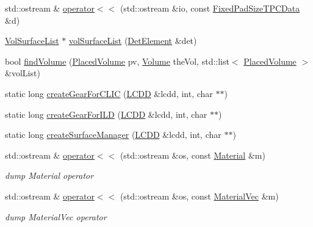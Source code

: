 \begin{DoxyCompactItemize}
\item 
std::ostream \& \hyperlink{namespace_d_d4hep_1_1_d_d_rec_aa514e41eeafbaef792fcf63b9f571f79}{operator$<$$<$} (std::ostream \&io, const \hyperlink{struct_d_d4hep_1_1_d_d_rec_1_1_struct_extension}{FixedPadSizeTPCData} \&d)
\item 
\hyperlink{struct_d_d4hep_1_1_d_d_rec_1_1_vol_surface_list}{VolSurfaceList} $\ast$ \hyperlink{namespace_d_d4hep_1_1_d_d_rec_a59c95bbf8cdb6547cfa3f9fa969d4031}{volSurfaceList} (\hyperlink{class_d_d4hep_1_1_geometry_1_1_det_element}{DetElement} \&det)
\item 
bool \hyperlink{namespace_d_d4hep_1_1_d_d_rec_a7b23370837eb2d8876a1e18bb258fd3f}{findVolume} (\hyperlink{class_d_d4hep_1_1_geometry_1_1_placed_volume}{PlacedVolume} pv, \hyperlink{class_d_d4hep_1_1_geometry_1_1_volume}{Volume} theVol, std::list$<$ \hyperlink{class_d_d4hep_1_1_geometry_1_1_placed_volume}{PlacedVolume} $>$ \&volList)
\item 
static long \hyperlink{namespace_d_d4hep_1_1_d_d_rec_a8eda7f805466b45870d45a7eea090a98}{createGearForCLIC} (\hyperlink{class_d_d4hep_1_1_geometry_1_1_l_c_d_d}{LCDD} \&lcdd, int, char $\ast$$\ast$)
\item 
static long \hyperlink{namespace_d_d4hep_1_1_d_d_rec_aa9a44ffd1338e5e01378ca9ce61656cc}{createGearForILD} (\hyperlink{class_d_d4hep_1_1_geometry_1_1_l_c_d_d}{LCDD} \&lcdd, int, char $\ast$$\ast$)
\item 
static long \hyperlink{namespace_d_d4hep_1_1_d_d_rec_ac05724c87af6fb53f1305b968449c19b}{createSurfaceManager} (\hyperlink{class_d_d4hep_1_1_geometry_1_1_l_c_d_d}{LCDD} \&lcdd, int, char $\ast$$\ast$)
\item 
std::ostream \& \hyperlink{namespace_d_d4hep_1_1_d_d_rec_ae8f5d05fd4ac3fcd53bc8f469f9b4ec4}{operator$<$$<$} (std::ostream \&os, const \hyperlink{class_d_d4hep_1_1_geometry_1_1_material}{Material} \&m)
\begin{DoxyCompactList}\small\item\em dump Material operator \item\end{DoxyCompactList}\item 
std::ostream \& \hyperlink{namespace_d_d4hep_1_1_d_d_rec_a8e4fdb5e46547f315ba9b683d2b9e0e7}{operator$<$$<$} (std::ostream \&os, const \hyperlink{namespace_d_d4hep_1_1_d_d_rec_a69fdab2f851316d2b9e50956920359f7}{MaterialVec} \&m)
\begin{DoxyCompactList}\small\item\em dump MaterialVec operator \item\end{DoxyCompactList}\end{DoxyCompactItemize}


